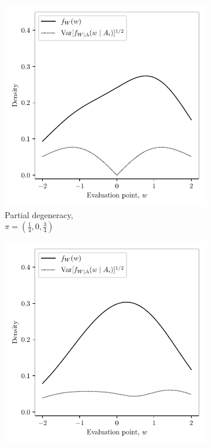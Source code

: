 \begin{figure}[ht]
\begin{subfigure}{0.32\textwidth}
    \includegraphics[scale=0.48]{graphics/illustration_partial.pdf}
    \caption{
      Partial degeneracy, \\
      $\pi = \left( \frac{1}{4}, 0, \frac{3}{4} \right)$
    }
  \end{subfigure}
  \begin{subfigure}{0.32\textwidth}
    \centering
    \includegraphics[scale=0.48]{graphics/illustration_none.pdf}

\end{subfigure}
\end{figure}
